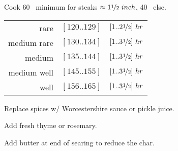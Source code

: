 \begin{variation}
\item Cook 60 \minute~minimum for steaks $\approx1\nicefrac{1}{2}~inch$, 40 \minute~else.
	\begin{center}
	\begin{tabular}{r l l}
	rare        & $[120..129]$ \Fahrenheit & $[1..2\nicefrac{1}{2}]~hr$\\
	medium rare & $[130..134]$ \Fahrenheit & $[1..3\nicefrac{1}{2}]~hr$\\
	medium      & $[135..144]$ \Fahrenheit & $[1..3\nicefrac{1}{2}]~hr$\\
	medium well & $[145..155]$ \Fahrenheit & $[1..3\nicefrac{1}{2}]~hr$\\
	well        & $[156..165]$ \Fahrenheit & $[1..3\nicefrac{1}{2}]~hr$
	\end{tabular}
	\end{center}

\item Replace spices w/ Worcestershire sauce or pickle juice.

\item Add fresh thyme or rosemary.

\item Add butter at end of searing to reduce the char.
\end{variation}


\recipeend%
